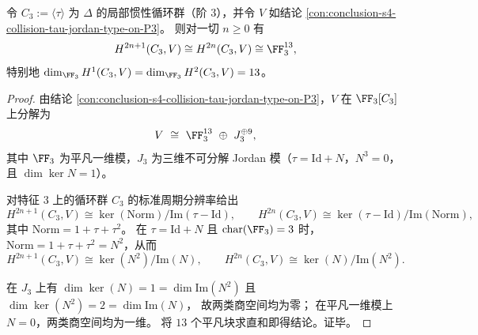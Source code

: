 \begin{conclusion}\label{con:conclusion-s4-collision-c3-cohomology-dimension-formula}
令 \(C_3:=\langle\tau\rangle\) 为 \(\Delta\) 的局部惯性循环群（阶 \(3\)），并令 \(V\) 如结论
\ref{con:conclusion-s4-collision-tau-jordan-type-on-P3}。
则对一切 \(n\ge 0\) 有
\[
H^{2n+1}(C_3,V)\cong H^{2n}(C_3,V)\cong \FF_3^{13},
\]
特别地
\(
\dim_{\FF_3}H^1(C_3,V)=\dim_{\FF_3}H^2(C_3,V)=13
\)。
\end{conclusion}
\begin{proof}
由结论 \ref{con:conclusion-s4-collision-tau-jordan-type-on-P3}，\(V\) 在 \(\FF_3[C_3]\) 上分解为
\[
V\ \cong\ \FF_3^{13}\ \oplus\ J_3^{\oplus 9},
\]
其中 \(\FF_3\) 为平凡一维模，\(J_3\) 为三维不可分解 Jordan 模（\(\tau=\mathrm{Id}+N\)，\(N^3=0\)，且 \(\dim\ker N=1\)）。
\par
对特征 \(3\) 上的循环群 \(C_3\) 的标准周期分辨率给出
\[
H^{2n+1}(C_3,V)\cong \ker(\mathrm{Norm})/\mathrm{Im}(\tau-\mathrm{Id}),\qquad
H^{2n}(C_3,V)\cong \ker(\tau-\mathrm{Id})/\mathrm{Im}(\mathrm{Norm}),
\]
其中 \(\mathrm{Norm}=1+\tau+\tau^2\)。
在 \(\tau=\mathrm{Id}+N\) 且 \(\mathrm{char}(\FF_3)=3\) 时，
\(
\mathrm{Norm}=1+\tau+\tau^2=N^2
\)，从而
\[
H^{2n+1}(C_3,V)\cong \ker(N^2)/\mathrm{Im}(N),\qquad
H^{2n}(C_3,V)\cong \ker(N)/\mathrm{Im}(N^2).
\]
\par
在 \(J_3\) 上有
\(
\dim\ker(N)=1=\dim\mathrm{Im}(N^2)
\)
且
\(
\dim\ker(N^2)=2=\dim\mathrm{Im}(N)
\)，
故两类商空间均为零；
在平凡一维模上 \(N=0\)，两类商空间均为一维。
将 \(13\) 个平凡块求直和即得结论。证毕。
\end{proof}

